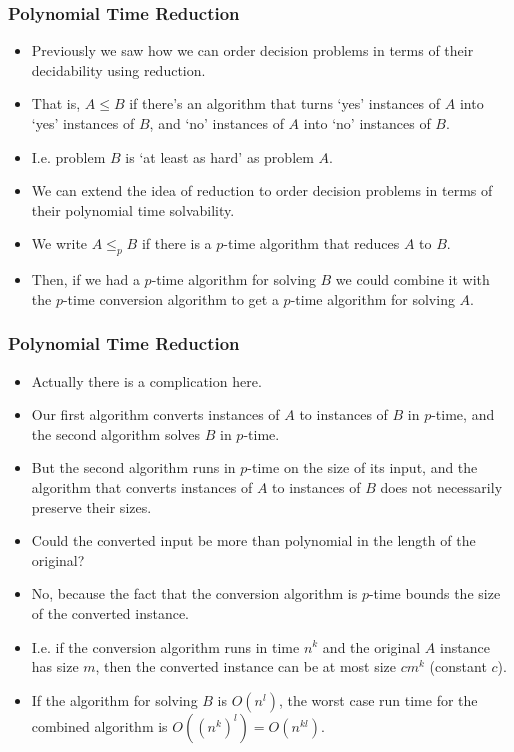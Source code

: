 \documentclass[handout]{beamer}
\begin{document}
\begin{frame}
\frametitle{Polynomial Time Reduction}
\begin{itemize}
\item Previously we saw how we can order decision problems in terms of their decidability using reduction. 
\vspace{0.2cm}
\item That is, $A\leq B$ if there's an algorithm that turns `yes' instances of $A$ into `yes' instances of $B$, and `no' instances of $A$ into `no' instances of $B$. 
\vspace{0.2cm}
\item I.e. problem $B$ is `at least as hard' as problem $A$.
\vspace{0.2cm}
\item We can extend the idea of reduction to order decision problems in terms of their polynomial time solvability. 
\vspace{0.2cm}
\item We write $A\leq_p B$ if there is a $p$-time algorithm that reduces $A$ to $B$. 
\vspace{0.2cm}
\item Then, if we had a $p$-time algorithm for solving $B$ we could combine it with the $p$-time conversion algorithm to get a $p$-time algorithm for solving $A$.
\end{itemize}
\end{frame}

\begin{frame}
\frametitle{Polynomial Time Reduction}
\begin{itemize}
\item Actually there is a complication here. 
\item Our first algorithm converts instances of $A$ to instances of $B$ in $p$-time, and the second algorithm solves $B$ in $p$-time. 
\item But the second algorithm runs in $p$-time on the size of its input, and the algorithm that converts instances of $A$ to instances of $B$ does not necessarily preserve their sizes. 
\item Could the converted input be more than polynomial in the length of the original?
\item No, because the fact that the conversion algorithm is $p$-time bounds the size of the converted instance. 
\item I.e. if the conversion algorithm runs in time $n^k$ and the original $A$ instance has size $m$, then the converted instance can be at most size $cm^k$ (constant $c$). 
\item If the algorithm for solving $B$ is $O(n^l)$, the worst case run time for the combined algorithm is $O((n^k)^l)=O(n^{kl})$.  
\end{itemize}
\end{frame}
\end{document}
